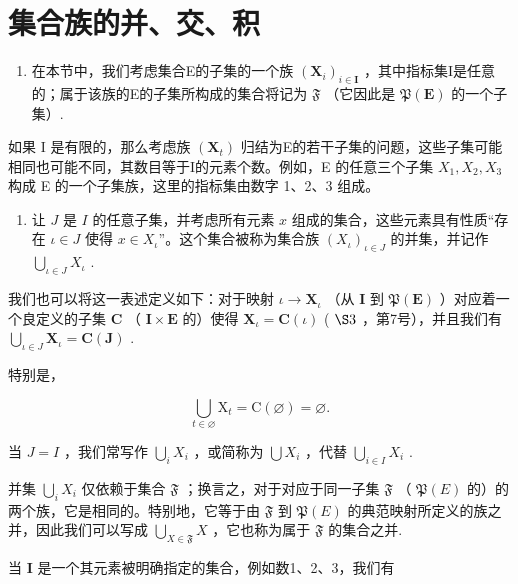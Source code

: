 \section{集合族的并、交、积}

\begin{enumerate}
\def\labelenumi{\arabic{enumi}.}
\tightlist
\item
  在本节中，我们考虑集合E的子集的一个族 \((\mathbf{X}_{i})_{i\in\mathbf{I}}\) ，其中指标集I是任意的；属于该族的E的子集所构成的集合将记为 \(\mathfrak{F}\) （它因此是 \(\mathfrak{P}(\mathbf{E})\) 的一个子集）.
\end{enumerate}

如果 I 是有限的，那么考虑族 \((\mathbf{X}_{t})\) 归结为E的若干子集的问题，这些子集可能相同也可能不同，其数目等于I的元素个数。例如，E 的任意三个子集 \(X_{1}, X_{2}, X_{3}\) 构成 E 的一个子集族，这里的指标集由数字 1、2、3 组成。

\begin{enumerate}
\def\labelenumi{\arabic{enumi}.}
\setcounter{enumi}{1}
\tightlist
\item
  让 \(J\) 是 \(I\) 的任意子集，并考虑所有元素 \(x\) 组成的集合，这些元素具有性质“存在 \(\iota \in J\) 使得 \(x \in X_\iota\)''。这个集合被称为集合族 \((X_\iota)_{\iota \in J}\) 的并集，并记作 \(\bigcup_{\iota\in J} X_\iota\) .
\end{enumerate}

我们也可以将这一表述定义如下：对于映射 \(\iota \to \mathbf{X}_{\iota}\) （从 \(\mathbf{I}\) 到 \(\mathfrak{P}(\mathbf{E})\) ）对应着一个良定义的子集 \(\mathbf{C}\) （ \(\mathbf{I} \times \mathbf{E}\) 的）使得 \(\mathbf{X}_{\iota} = \mathbf{C}(\iota)\) ( \(\S 3\) ，第7号），并且我们有 \(\bigcup_{\iota \in J} \mathbf{X}_{\iota} = \mathbf{C}(\mathbf{J})\) .

特别是，

\[
\bigcup_ {t \in \varnothing} \mathrm{X} _ {t} = \mathrm{C} (\varnothing) = \varnothing .\tag{33}
\]

当 \(J = I\) ，我们常写作 \(\bigcup_{i} X_i\) ，或简称为 \(\bigcup X_i\) ，代替 \(\bigcup_{i \in I} X_i\) .

并集 \(\bigcup_{i} X_{i}\) 仅依赖于集合 \(\mathfrak{F}\) ；换言之，对于对应于同一子集 \(\mathfrak{F}\) （ \(\mathfrak{P}(E)\) 的）的两个族，它是相同的。特别地，它等于由 \(\mathfrak{F}\) 到 \(\mathfrak{P}(E)\) 的典范映射所定义的族之并，因此我们可以写成 \(\bigcup_{X \in \mathfrak{F}} X\) ，它也称为属于 \(\mathfrak{F}\) 的集合之并.

当 \(\mathbf{I}\) 是一个其元素被明确指定的集合，例如数1、2、3，我们有


